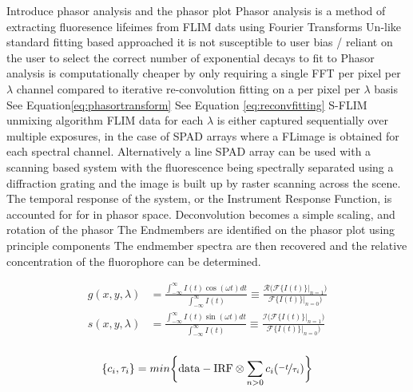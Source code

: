 \documentclass{optica-article}
\begin{document}
\begin{outline}
    \1 Introduce phasor analysis and the phasor plot
        \2 Phasor analysis is a method of extracting fluoresence lifeimes from FLIM dats using Fourier Transforms
        \2 Un-like standard fitting based approached it is not susceptible to user bias / reliant on the user to select the correct number of exponential decays to fit to
        \2 Phasor analysis is computationally cheaper by only requiring a single FFT per pixel per $\lambda$ channel compared to iterative re-convolution fitting on a per pixel per $\lambda$ basis
        \2 See Equation\ref{eq:phasortransform}
        \2 See Equation \ref{eq:reconvfitting}
    \1 S-FLIM unmixing algorithm
        \2 FLIM data for each $\lambda$ is either captured sequentially over multiple exposures, in the case of SPAD arrays where a FLimage is obtained for each spectral channel. Alternatively a line SPAD array can be used with a scanning based system with the fluorescence being spectrally separated using a diffraction grating and the image is built up by raster scanning across the scene.
        \2 The temporal response of the system, or the Instrument Response Function, is accounted for for in phasor space. Deconvolution becomes a simple scaling, and rotation of the phasor
        \2 The Endmembers are identified on the phasor plot using principle components
        \2 The endmember spectra are then recovered and the relative concentration of the fluorophore can be determined.
\end{outline}

\begin{align}
    g(x,y,\lambda) &= \frac{\int_{-\infty}^{\infty}I(t)\cos{(\omega t)dt}}{\int_{-\infty}^{\infty}I(t)} \equiv \frac{\mathcal{R}\big(\mathcal{F}\{I(t)\}\rvert_{n=1}\big)}{\mathcal{F}\{I(t)\}\rvert_{n=0}\big)}\\
    s(x,y,\lambda) &= \frac{\int_{-\infty}^{\infty}I(t)\sin{(\omega t)dt}}{\int_{-\infty}^{\infty}I(t)} \equiv \frac{\mathcal{I}\big(\mathcal{F}\{I(t)\}\rvert_{n=1}\big)}{\mathcal{F}\{I(t)\}\rvert_{n=0}\big)}\\
    \label{eq:phasortransform}
\end{align}

\begin{equation}
    \{c_{i}, \tau_{i}\} = min\bigg\{\text{data} - \text{IRF}\otimes\sum_{n > 0}c_{i}(\nicefrac{-t}{\tau_{i}}) \bigg\}
    \label{eq:reconvfitting}
\end{equation}
\end{document}
